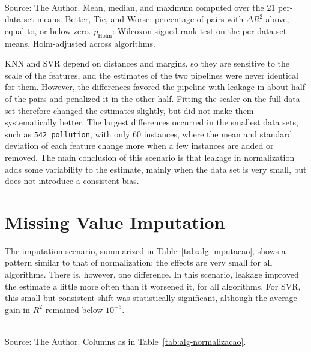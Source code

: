 \begin{table}[htb]
\centering
\caption{Effect of leakage in the normalization scenario, per algorithm.}
\label{tab:alg-normalizacao}
\small
\setlength{\tabcolsep}{3.5pt}

\\[2pt]
\footnotesize Source: The Author. Mean, median, and maximum computed over the 21 per-data-set means. Better, Tie, and Worse: percentage of pairs with $\Delta R^2$ above, equal to, or below zero. $p_{\text{Holm}}$: Wilcoxon signed-rank test on the per-data-set means, Holm-adjusted across algorithms.
\end{table}

KNN and SVR depend on distances and margins, so they are sensitive to the scale
of the features, and the estimates of the two pipelines were never identical for
them. However, the differences favored the pipeline with leakage in about half of
the pairs and penalized it in the other half. Fitting the scaler on the full
data set therefore changed the estimates slightly, but did not make them
systematically better. The largest differences occurred in the smallest data
sets, such as \texttt{542\_pollution}, with only 60 instances, where the mean and
standard deviation of each feature change more when a few instances are added or
removed. The main conclusion of this scenario is that leakage in normalization
adds some variability to the estimate, mainly when the data set is very small,
but does not introduce a consistent bias.

\section{Missing Value Imputation}
\label{sec:res-imputacao}

The imputation scenario, summarized in Table~\ref{tab:alg-imputacao}, shows a
pattern similar to that of normalization: the effects are very small for all
algorithms. There is, however, one difference. In this scenario, leakage
improved the estimate a little more often than it worsened it, for all
algorithms. For SVR, this small but consistent shift was statistically
significant, although the average gain in $R^2$ remained below $10^{-3}$.

\begin{table}[htb]
\centering
\caption{Effect of leakage in the imputation scenario, per algorithm (all imputers and missing rates).}
\label{tab:alg-imputacao}
\small
\setlength{\tabcolsep}{3.5pt}

\\[2pt]
\footnotesize Source: The Author. Columns as in Table~\ref{tab:alg-normalizacao}.
\end{table}

